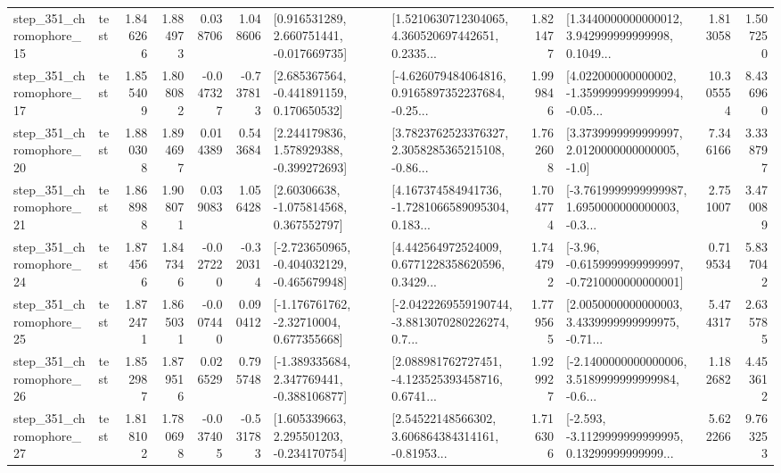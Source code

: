 \begin{tabular}{llrrrrllrlrr}
  step\_351\_chromophore\_15 &      test &      1.846266 &    1.884973 &      0.038706 &  1.048606 &    [0.916531289, 2.660751441, -0.017669735] &  [1.5210630712304065, 4.360520697442651, 0.2335... &       1.821477 &  [1.3440000000000012, 3.942999999999998, 0.1049... &            1.813058 &          1.507250 \\
  step\_351\_chromophore\_17 &      test &      1.855409 &    1.808082 &     -0.047327 & -0.737813 &    [2.685367564, -0.441891159, 0.170650532] &  [-4.626079484064816, 0.9165897352237684, -0.25... &       1.999846 &  [4.022000000000002, -1.3599999999999994, -0.05... &           10.305554 &          8.436960 \\
  step\_351\_chromophore\_20 &      test &      1.880308 &    1.894697 &      0.014389 &  0.543684 &    [2.244179836, 1.578929388, -0.399272693] &  [3.7823762523376327, 2.3058285365215108, -0.86... &       1.762608 &     [3.3739999999999997, 2.0120000000000005, -1.0] &            7.346166 &          3.338797 \\
  step\_351\_chromophore\_21 &      test &      1.868988 &    1.908071 &      0.039083 &  1.056428 &     [2.60306638, -1.075814568, 0.367552797] &  [4.167374584941736, -1.7281066589095304, 0.183... &       1.704774 &  [-3.7619999999999987, 1.6950000000000003, -0.3... &            2.751007 &          3.470089 \\
  step\_351\_chromophore\_24 &      test &      1.874566 &    1.847346 &     -0.027220 & -0.320314 &  [-2.723650965, -0.404032129, -0.465679948] &  [4.442564972524009, 0.6771228358620596, 0.3429... &       1.744792 &  [-3.96, -0.6159999999999997, -0.7210000000000001] &            0.719534 &          5.837042 \\
  step\_351\_chromophore\_25 &      test &      1.872471 &    1.865031 &     -0.007440 &  0.090412 &    [-1.176761762, -2.32710004, 0.677355668] &  [-2.0422269559190744, -3.8813070280226274, 0.7... &       1.779565 &  [2.0050000000000003, 3.4339999999999975, -0.71... &            5.474317 &          2.635785 \\
  step\_351\_chromophore\_26 &      test &      1.852987 &    1.879516 &      0.026529 &  0.795748 &   [-1.389335684, 2.347769441, -0.388106877] &  [2.088981762727451, -4.123525393458716, 0.6741... &       1.929927 &  [-2.1400000000000006, 3.5189999999999984, -0.6... &            1.182682 &          4.453612 \\
  step\_351\_chromophore\_27 &      test &      1.818102 &    1.780698 &     -0.037405 & -0.531783 &    [1.605339663, 2.295501203, -0.234170754] &  [2.54522148566302, 3.606864384314161, -0.81953... &       1.716306 &  [-2.593, -3.1129999999999995, 0.13299999999999... &            5.622266 &          9.763253 \\

\end{tabular}
